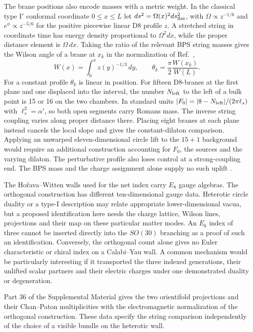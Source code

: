 \documentclass[aps,prd,reprint,onecolumn,nofootinbib,amsmath,amssymb]{revtex4-2}
\begin{document}
The brane positions also encode masses with a metric weight. In the classical type I$'$ conformal coordinate $0\le x\le L$ let $ds^2=\Omega(x)^2 ds_{\rm flat}^2$, with $\Omega\propto z^{-1/6}$ and $e^\phi\propto z^{-5/6}$ for the positive piecewise linear D8 profile $z$. A stretched string in coordinate time has energy density proportional to $\Omega^2dx$, while the proper distance element is $\Omega\,dx$. Taking the ratio of the relevant BPS string masses gives the Wilson angle of a brane at $x_k$ in the normalization of Ref.~\cite{dictionarynote},
\begin{equation}
 W(x)=\int_0^x z(y)^{-1/3}\,dy,\qquad
 \theta_k=\frac{\pi}{2}\frac{W(x_k)}{W(L)} .
\end{equation}
For a constant profile $\theta_k$ is linear in position. For fifteen D8-branes at the first plane and one displaced into the interval, the number $N_{\rm left}$ to the left of a bulk point is 15 or 16 on the two chambers. In standard units $|F_0|=|8-N_{\rm left}|/(2\pi\ell_s)$ with $\ell_s^2=\alpha'$, so both open segments carry Romans mass. The inverse string coupling varies along proper distance there. Placing eight branes at each plane instead cancels the local slope and gives the constant-dilaton comparison. Applying an unwarped eleven-dimensional circle lift to the $15+1$ background would require an additional construction accounting for $F_0$, the sources and the varying dilaton. The perturbative profile also loses control at a strong-coupling end. The BPS mass and the charge assignment alone supply no such uplift \cite{PW1996,BGL1998}.

The Ho\v{r}ava--Witten walls used for the net index carry $E_8$ gauge algebras. The orthogonal construction has different ten-dimensional gauge data. Heterotic circle duality or a type-I description may relate appropriate lower-dimensional vacua, but a proposed identification here needs the charge lattice, Wilson lines, projections and their map on these particular matter modes. An $E_6$ index of three cannot be inserted directly into the $SO(30)$ branching as a proof of such an identification. Conversely, the orthogonal count alone gives no Euler characteristic or chiral index on a Calabi--Yau wall. A common mechanism would be particularly interesting if it transported the three indexed generations, their unlifted scalar partners and their electric charges under one demonstrated duality or degeneration.

Part 36 of the Supplemental Material gives the two orientifold projections and their Chan--Paton multiplicities with the electromagnetic normalization of the orthogonal construction. These data specify the string comparison independently of the choice of a visible bundle on the heterotic wall.
\end{document}

